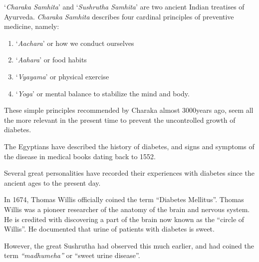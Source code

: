 ‘\textit{Charaka Samhita}’ and ‘\textit{Sushrutha Samhita}’ are two ancient Indian treatises of Ayurveda. \textit{Charaka Samhita} describes four cardinal princi\-ples of preventive medicine, namely:

\begin{enumerate}
\itemsep=0pt
\item ‘\textit{Aachara}’ or how we conduct ourselves

\item ‘\textit{Aahara}’ or food habits

\item ‘\textit{Vyayama}’ or physical exercise

\item ‘\textit{Yoga}’ or mental balance to stabilize the mind and body.
\end{enumerate}

These simple principles recommended by Charaka almost 3000\break years ago, seem all the more relevant in the present time to prevent the uncontrolled growth of diabetes.

The Egyptians have described the history of diabetes, and signs and symptoms of the disease in medical books dating back to 1552.

Several great personalities have recorded their experiences with diabetes since the ancient ages to the present day.

In 1674, Thomas Willis officially coined the term “Diabetes Melli\-tus”. Thomas Willis was a pioneer researcher of the anatomy of the brain and nervous system. He is credited with discovering a part of the brain now known as the “circle of Willis”. He documented that urine of patients with diabetes is sweet.

However, the great Sushrutha had observed this much earlier, and had coined the term \textit{“madhumeha”} or “sweet urine disease”.

